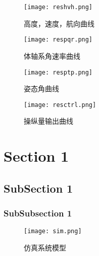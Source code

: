 \begin{figure}[!h]
\centering\texttt{[image: reshvh.png]}
\caption{高度，速度，航向曲线}
\label{course}
\end{figure}

\begin{figure}[!h]
\centering\texttt{[image: respqr.png]}
\caption{体轴系角速率曲线}
\label{course}
\end{figure}

\begin{figure}[!h]
\centering\texttt{[image: resptp.png]}
\caption{姿态角曲线}
\label{course}
\end{figure}

\begin{figure}[!h]
\centering\texttt{[image: resctrl.png]}
\caption{操纵量输出曲线}
\label{course}
\end{figure}
\section{Section 1}
\subsection{SubSection 1}
\subsubsection{SubSubsection 1}
\begin{figure}[!h]
\centering\texttt{[image: sim.png]}
\caption{仿真系统模型}
\label{sim}
\end{figure}

\endinput

